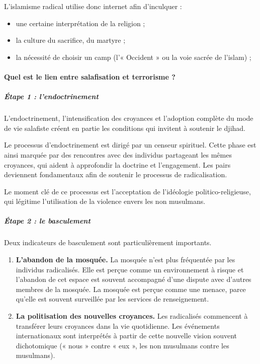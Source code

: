 L'islamisme radical utilise donc internet afin d'inculquer :


\begin{itemize}
\item
  une certaine interprétation de la religion ;
\item
  la culture du sacrifice, du martyre ;
\item
  la nécessité de choisir un camp (l'« Occident » ou la voie sacrée de
  l'islam) ;
\end{itemize}

\paragraph{Quel est le lien entre salafisation et terrorisme ?}
\subparagraph{Étape 1 :
l'endoctrinement}


L'endoctrinement, l'intensification des croyances et l'adoption complète
du mode
de vie salafiste créent en partie les conditions qui invitent à soutenir
le djihad.

Le processus d'endoctrinement est dirigé par un {censeur
spirituel.} Cette phase est ainsi marquée par des rencontres avec des
individus partageant les mêmes croyances, qui aident à approfondir la
doctrine et l'engagement. Les pairs deviennent fondamentaux afin de
soutenir le processus de radicalisation.

Le moment clé de ce processus est l'acceptation de l'idéologie
politico-religieuse, qui légitime l'utilisation de la violence envers
les non musulmans.


\subparagraph{Étape 2 : le basculement}


Deux indicateurs de basculement sont particulièrement importants.


\begin{enumerate}
\def\labelenumi{\arabic{enumi}.}
\item
  \textbf{L'abandon de la mosquée.} La mosquée n'est plus fréquentée par
  les individus radicalisés. Elle est perçue comme un environnement à
  risque et l'abandon de cet espace est souvent accompagné d'une dispute
  avec d'autres membres de la mosquée. La mosquée est perçue comme une
  menace, parce qu'elle est souvent surveillée par les services de
  renseignement.
\item
  \textbf{La politisation des nouvelles croyances.} Les radicalisés
  commencent à transférer leurs croyances dans la vie quotidienne. Les
  événements internationaux sont interprétés à partir de cette nouvelle
  vision souvent dichotomique (« nous » contre « eux », les non
  musulmans contre les musulmans).
\end{enumerate}





